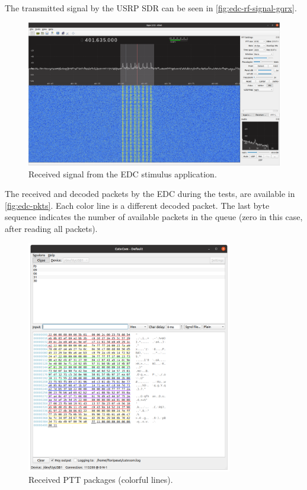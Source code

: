 The transmitted signal by the USRP SDR can be seen in \autoref{fig:edc-rf-signal-gqrx}.

\begin{figure}[!ht]
    \begin{center}
        \includegraphics[width=\textwidth]{figures/edc_report/edc-stimulus}
        \caption{Received signal from the EDC stimulus application.}
        \label{fig:edc-rf-signal-gqrx}
    \end{center}
\end{figure}

The received and decoded packets by the EDC during the tests, are available in \autoref{fig:edc-pkts}. Each color line is a different decoded packet. The last byte sequence indicates the number of available packets in the queue (zero in this case, after reading all packets).

\begin{figure}[!ht]
    \begin{center}
        \includegraphics[width=0.8\textwidth]{figures/edc_report/ptt-pkg}
        \caption{Received PTT packages (colorful lines).}
        \label{fig:edc-pkts}
    \end{center}
\end{figure}

